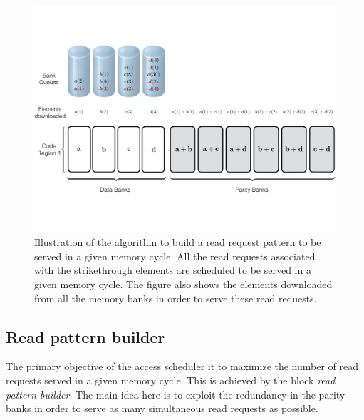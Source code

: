 \begin{figure}[htbp]
	\centering
	\includegraphics[width=0.96\linewidth]{fig/Read-Algo-Example.pdf}
	\caption{{Illustration of the algorithm to build a read request pattern to be served in a given memory cycle. All the read requests associated with the strikethrough elements are scheduled to be served in a given memory cycle. The figure also shows the elements downloaded from all the memory banks in order to serve these read requests.}}
	\label{fig:readAlgoAccessPattern}
\end{figure}
\subsection{Read pattern builder}
\label{sec:readCodingAlgo}
The primary objective of the access scheduler it to maximize the number of read requests served in a given memory cycle. This is achieved by the block {\em read pattern builder}. The main idea here is to exploit the redundancy in the parity banks in order to serve as many simultaneous read requests as possible.


